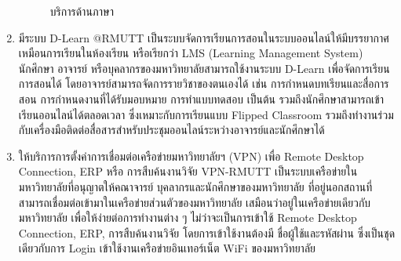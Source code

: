 \begin{enumerate}
\begin{figure}[H]
\begin{center}
		\caption{บริการด้านภาษา}
	\end{center}
\end{figure}
\item มีระบบ D-Learn @RMUTT เป็นระบบจัดการเรียนการสอนในระบบออนไลน์ให้มีบรรยากาศ
เหมือนการเรียนในห้องเรียน หรือเรียกว่า LMS (Learning Management System) นักศึกษา อาจารย์ หรือบุคลากรของมหาวิทยาลัยสามารถใช้งานระบบ D-Learn เพื่อจัดการเรียนการสอนได้ โดยอาจารย์สามารถจัดการรายวิชาของตนเองได้ เช่น การกำหนดบทเรียนและสื่อการสอน การกำหนดงานที่ได้รับมอบหมาย การทำแบบทดสอบ เป็นต้น รวมถึงนักศึกษาสามารถเข้าเรียนออนไลน์ได้ตลอดเวลา ซึ่งเหมาะกับการเรียนแบบ Flipped Classroom รวมถึงทำงานร่วมกับเครื่องมือติดต่อสื่อสารสำหรับประชุมออนไลน์ระหว่างอาจารย์และนักศึกษาได้
\item ให้บริการการตั้งค่าการเชื่อมต่อเครือข่ายมหาวิทยาลัยฯ (VPN) เพื่อ Remote Desktop 
Connection, ERP หรือ การสืบค้นงานวิจัย  VPN-RMUTT เป็นระบบเครือข่ายในมหาวิทยาลัยที่อนุญาตให้คณาจารย์ บุคลากรและนักศึกษาของมหาวิทยาลัย ที่อยู่นอกสถานที่สามารถเชื่อมต่อเข้ามาในเครือข่ายส่วนตัวของมหาวิทยาลัย เสมือนว่าอยู่ในเครือข่ายเดียวกับมหาวิทยาลัย เพื่อให้ง่ายต่อการทำงานต่าง ๆ ไม่ว่าจะเป็นการเข้าใช้ Remote Desktop Connection, ERP, การสืบค้นงานวิจัย โดยการเข้าใช้งานต้องมี ชื่อผู้ใช้และรหัสผ่าน ซึ่งเป็นชุดเดียวกับการ Login เข้าใช้งานเครือข่ายอินเทอร์เน็ต WiFi ของมหาวิทยาลัย


\end{enumerate}
\begin{doclist}
\end{doclist}


